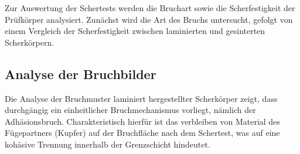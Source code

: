 \begin{table}[H]
\centering

\adjustbox{max width=\textwidth}{



\renewcommand{\arraystretch}{1.7} %
\fontsize{18pt}{20pt}\selectfont
\begin{tabular}{|l|c|c|c|c|}
\hline
\textbf{Scherkörper} & \multicolumn{1}{l|}{\textbf{Maximale Scherkraft} {[}\si{\newton}{]}} & \multicolumn{1}{l|}{\textbf{Durchschnittskraft} {[}\si{\newton}{]}} & \multicolumn{1}{l|}{\textbf{Fläche} {[}\si{\milli\meter\squared}{]}} & \multicolumn{1}{l|}{\textbf{Scherfestigkeit} {[}\si{\newton\per\milli\meter\squared}{]}} \\ \hline
\textbf{1} & 195,05 & 77,34 & 5,29 & 36,87 \\ \hline
\textbf{2} & 146,72 & 55,16 & 5,29 & 27,74 \\ \hline
\textbf{3} & 143,32 & 47,98 & 5,29 & 27,09 \\ \hline
\textbf{4} & 129,39 & 39,87 & 5,29 & 24,46 \\ \hline
\textbf{5} & 142,67 & 54,48 & 5,29 & 26,97 \\ \hline
\textbf{6} & 128,16 & 51,59 & 5,29 & 24,23 \\ \hline
\textbf{7} & 147,18 & 70,87 & 5,29 & 27,82 \\ \hline
\textbf{8} & 131,37 & 49,35 & 5,29 & 24,83 \\ \hline
\textbf{9} & 175,58 & 78,33 & 5,29 & 33,19 \\ \hline
\end{tabular}}
\vspace{0.5cm}
\caption{Messung der laminierten Scherkörper}
\label{Tab.2}
\end{table}

Zur Auswertung der Schertests werden die Bruchart sowie die Scherfestigkeit der Prüfkörper analysiert. Zunächst wird die Art des Bruchs untersucht, gefolgt von einem Vergleich der Scherfestigkeit zwischen laminierten und gesinterten Scherkörpern.

\subsection{Analyse der Bruchbilder}

Die Analyse der Bruchmuster laminiert hergestellter Scherkörper zeigt, dass durchgängig ein einheitlicher Bruchmechanismus vorliegt, nämlich der Adhäsionsbruch. Charakteristisch hierfür ist das verbleiben von Material des Fügepartners (Kupfer) auf der Bruchfläche nach dem Schertest, was auf eine kohäsive Trennung innerhalb der Grenzschicht hindeutet.

